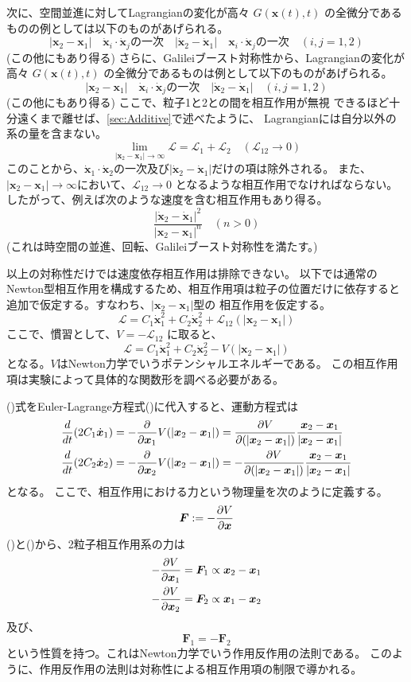 \documentclass[a4paper,11pt]{ltjsarticle}
\newcommand{\La}{\mathcal{L}}
\begin{document}
次に、空間並進に対してLagrangianの変化が高々 $G(\bm{x}(t),t)$ の全微分であるものの例としては以下のものがあげられる。
\[
|\bm{x}_2-\bm{x}_1| \quad \dot{\bm{x}}_i\cdot\dot{\bm{x}}_jの一次 \quad |\dot{\bm{x}}_2-\dot{\bm{x}}_1| \quad \bm{x}_i\cdot\dot{\bm{x}}_jの一次 \quad (i,j=1,2)
\]
(この他にもあり得る)
さらに、Galileiブースト対称性から、Lagrangianの変化が高々 $G(\bm{x}(t),t)$ の全微分であるものは例として以下のものがあげられる。
\[
|\bm{x}_2-\bm{x}_1| \quad \dot{\bm{x}}_i\cdot\dot{\bm{x}}_jの一次 \quad |\dot{\bm{x}}_2-\dot{\bm{x}}_1| \quad (i,j=1,2)
\]
(この他にもあり得る)
ここで、粒子1と2との間を相互作用が無視
できるほど十分遠くまで離せば、\ref{sec:Additive}で述べたように、
Lagrangianには自分以外の系の量を含まない。
\[
\lim_{|\bm{x}_2-\bm{x}_1|\rightarrow \infty}\La = \La_1 + \La_2 \quad (\La_{12}\rightarrow 0)
\]
このことから、$\dot{\bm{x}}_1\cdot\dot{\bm{x}}_2$の一次及び$|\dot{\bm{x}}_2-\dot{\bm{x}}_1|$だけの項は除外される。
また、$|\bm{x}_2-\bm{x}_1|\rightarrow \infty$において、$\La_{12}\rightarrow 0$ となるような相互作用でなければならない。
したがって、例えば次のような速度を含む相互作用もあり得る。
$$\frac{|\dot{\bm{x}}_2-\dot{\bm{x}}_1|^2}{|\bm{x}_2-\bm{x}_1|^n} \quad (n>0)$$
(これは時空間の並進、回転、Galileiブースト対称性を満たす。)

以上の対称性だけでは速度依存相互作用は排除できない。
以下では通常のNewton型相互作用を構成するため、相互作用項は粒子の位置だけに依存すると追加で仮定する。すなわち、$|\bm{x}_2-\bm{x}_1|$型の
相互作用を仮定する。
\[
\La=C_1\dot{\bm{x}}_1^2+C_2\dot{\bm{x}}_2^2+\La_{12}(|\bm{x}_2-\bm{x}_1|)
\]
ここで、慣習として、$V=-\La_{12}$ に取ると、
\begin{equation}
\La=C_1\dot{\bm{x}}_1^2+C_2\dot{\bm{x}}_2^2-V(|\bm{x}_2-\bm{x}_1|)
\label{eq:Lagrangian int}
\end{equation}
となる。$V$はNewton力学でいうポテンシャルエネルギーである。
この相互作用項は実験によって具体的な関数形を調べる必要がある。

()式をEuler-Lagrange方程式()に代入すると、運動方程式は
\begin{align}
\frac{d}{dt}(2C_1\dot{\bm{x}}_1)&=-\frac{\partial}{\partial \bm{x}_1}V(|\bm{x}_2-\bm{x}_1|)=\pdv{V}{(|\bm{x}_2-\bm{x}_1|)}\frac{\bm{x}_2-\bm{x}_1}{|\bm{x}_2-\bm{x}_1|}
\label{eq:EOM1}
\\
\frac{d}{dt}(2C_2\dot{\bm{x}}_2)&=-\frac{\partial}{\partial \bm{x}_2}V(|\bm{x}_2-\bm{x}_1|)=-\pdv{V}{(|\bm{x}_2-\bm{x}_1|)}\frac{\bm{x}_2-\bm{x}_1}{|\bm{x}_2-\bm{x}_1|}
\label{eq:EOM2}
\end{align}
となる。
ここで、相互作用における力という物理量を次のように定義する。
\[
\bm{F}:=-\pdv{V}{\bm{x}}
\]
()と()から、2粒子相互作用系の力は
\begin{align*}
-\pdv{V}{\bm{x}_1}&=\bm{F}_{1}\propto \bm{x}_2-\bm{x}_1
\\
-\pdv{V}{\bm{x}_2}&=\bm{F}_{2}\propto \bm{x}_1-\bm{x}_2
\end{align*}
及び、
\[
\bm{F}_1=-\bm{F}_2
\]
という性質を持つ。これはNewton力学でいう作用反作用の法則である。
このように、作用反作用の法則は対称性による相互作用項の制限で導かれる。
\end{document}
